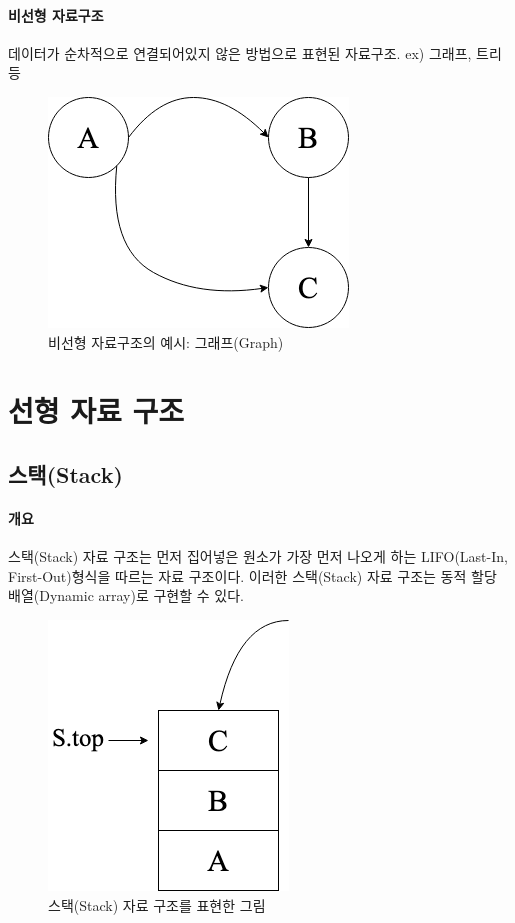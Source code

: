 \documentclass{article}
\begin{document}
        \paragraph{비선형 자료구조} 데이터가 순차적으로 연결되어있지 않은 방법으로 표현된 자료구조.
        ex) 그래프, 트리등
        \begin{figure}[h]
            \centering
            \includegraphics[scale=0.5]{Non_Linear_Structure.png}
            \caption{비선형 자료구조의 예시: 그래프(Graph)}
            \label{}
        \end{figure}
    \section{선형 자료 구조}
    \subsection{스택(Stack)}
    \paragraph{개요}
    스택(Stack) 자료 구조는 먼저 집어넣은 원소가 가장 먼저 나오게 하는 LIFO(Last-In, First-Out)형식을 따르는 자료 구조이다. \cite{cormen_2009}
    이러한 스택(Stack) 자료 구조는 동적 할당 배열(Dynamic array)로 구현할 수 있다.
    \begin{figure}[h]
        \centering
        \includegraphics[scale=0.5]{Stack.png}
        \caption{스택(Stack) 자료 구조를 표현한 그림}
        \label{}
    \end{figure}
    \newpage
\end{document}
